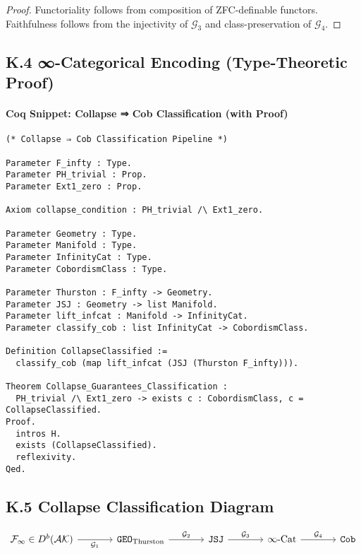\documentclass[11pt]{article}
\begin{document}
\begin{axiom}
\begin{axiom}
\begin{proof}
Functoriality follows from composition of ZFC-definable functors.  
Faithfulness follows from the injectivity of \( \mathcal{G}_3 \) and class-preservation of \( \mathcal{G}_4 \).
\end{proof}

\subsection*{K.4 ∞-Categorical Encoding (Type-Theoretic Proof)}

\paragraph{Coq Snippet: Collapse ⇒ Cob Classification (with Proof)}

\begin{lstlisting}[language=Coq, caption=Collapse Classification in Coq Type Theory]
(* Collapse ⇒ Cob Classification Pipeline *)

Parameter F_infty : Type.
Parameter PH_trivial : Prop.
Parameter Ext1_zero : Prop.

Axiom collapse_condition : PH_trivial /\ Ext1_zero.

Parameter Geometry : Type.
Parameter Manifold : Type.
Parameter InfinityCat : Type.
Parameter CobordismClass : Type.

Parameter Thurston : F_infty -> Geometry.
Parameter JSJ : Geometry -> list Manifold.
Parameter lift_infcat : Manifold -> InfinityCat.
Parameter classify_cob : list InfinityCat -> CobordismClass.

Definition CollapseClassified :=
  classify_cob (map lift_infcat (JSJ (Thurston F_infty))).

Theorem Collapse_Guarantees_Classification :
  PH_trivial /\ Ext1_zero -> exists c : CobordismClass, c = CollapseClassified.
Proof.
  intros H.
  exists (CollapseClassified).
  reflexivity.
Qed.
\end{lstlisting}

\subsection*{K.5 Collapse Classification Diagram}

\[
\begin{tikzcd}[column sep=large, row sep=large]
\mathcal{F}_\infty \in D^b(\mathcal{AK}) \arrow[r, "\mathcal{G}_1", swap] & 
\texttt{GEO}_{\text{Thurston}} \arrow[r, "\mathcal{G}_2"] & 
\texttt{JSJ} \arrow[r, "\mathcal{G}_3"] & 
\infty\text{-Cat} \arrow[r, "\mathcal{G}_4"] & 
\texttt{Cob}
\end{tikzcd}
\]


\end{axiom}
\end{axiom}
\end{document}
